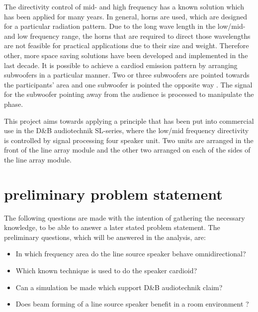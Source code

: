 The directivity control of mid- and high frequency has a known solution which has been applied for many years. In general, horns are used, which are designed for a particular radiation pattern. Due to the long wave length in the low/mid- and low frequency range, the horns that are required to direct those wavelengths are not feasible for practical applications due to their size and weight. Therefore other, more space saving solutions have been developed and implemented in the last decade. It is possible to achieve a cardiod emission pattern by arranging subwoofers in a particular manner. Two or three subwoofers are pointed towards the participants' area and one subwoofer is pointed the opposite way \citep{KS28}. The signal for the subwoofer pointing away from the audience is processed to manipulate the phase.


This project aims towards applying a principle that has been put into commercial use in the D\&B audiotechnik SL-series, where the low/mid frequency directivity is controlled by signal processing four speaker unit. Two units are arranged in the front of the line array module and the other two arranged on each of the sides of the line array module.



\section{preliminary problem statement}
The following questions are made with the intention of gathering the necessary knowledge, to be able to answer a later stated problem statement. The preliminary questions, which will be answered in the analysis, are:

\begin{itemize}
\item In which frequency area do the line source speaker behave omnidirectional?
\item Which known technique is used to do the speaker cardioid?
\item Can a simulation be made which support D\&B audiotechnik claim?
\item Does beam forming of a line source speaker benefit in a room environment ?
\end{itemize}



